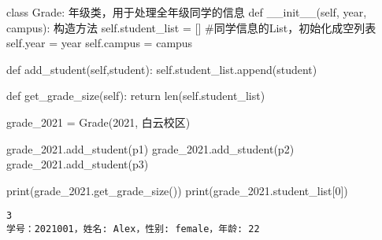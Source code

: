 \documentclass[
  letterpaper,
  DIV=11,
  numbers=noendperiod]{scrreprt}
\newenvironment{Shaded}{\begin{snugshade}}{\end{snugshade}}
\newcommand{\BuiltInTok}[1]{\textcolor[rgb]{0.00,0.23,0.31}{#1}}
\newcommand{\CommentTok}[1]{\textcolor[rgb]{0.37,0.37,0.37}{#1}}
\newcommand{\ControlFlowTok}[1]{\textcolor[rgb]{0.00,0.23,0.31}{#1}}
\newcommand{\DecValTok}[1]{\textcolor[rgb]{0.68,0.00,0.00}{#1}}
\newcommand{\FunctionTok}[1]{\textcolor[rgb]{0.28,0.35,0.67}{#1}}
\newcommand{\KeywordTok}[1]{\textcolor[rgb]{0.00,0.23,0.31}{#1}}
\newcommand{\NormalTok}[1]{\textcolor[rgb]{0.00,0.23,0.31}{#1}}
\newcommand{\OperatorTok}[1]{\textcolor[rgb]{0.37,0.37,0.37}{#1}}
\newcommand{\StringTok}[1]{\textcolor[rgb]{0.13,0.47,0.30}{#1}}
\newcommand{\VariableTok}[1]{\textcolor[rgb]{0.07,0.07,0.07}{#1}}
\begin{document}
\begin{Shaded}
\begin{Highlighting}[]
\KeywordTok{class}\NormalTok{ Grade:}
    \CommentTok{\textquotesingle{}\textquotesingle{}\textquotesingle{}}
\CommentTok{    年级类，用于处理全年级同学的信息}
\CommentTok{    \textquotesingle{}\textquotesingle{}\textquotesingle{}}
    \KeywordTok{def} \FunctionTok{\_\_init\_\_}\NormalTok{(}\VariableTok{self}\NormalTok{, year, campus):}
        \CommentTok{\textquotesingle{}\textquotesingle{}\textquotesingle{}}
\CommentTok{        构造方法}
\CommentTok{        \textquotesingle{}\textquotesingle{}\textquotesingle{}}
        \VariableTok{self}\NormalTok{.student\_list }\OperatorTok{=}\NormalTok{ [] }\CommentTok{\#同学信息的List，初始化成空列表}
        \VariableTok{self}\NormalTok{.year }\OperatorTok{=}\NormalTok{ year}
        \VariableTok{self}\NormalTok{.campus }\OperatorTok{=}\NormalTok{ campus}
    
    \KeywordTok{def}\NormalTok{ add\_student(}\VariableTok{self}\NormalTok{,student):}
        \VariableTok{self}\NormalTok{.student\_list.append(student)}
    
    \KeywordTok{def}\NormalTok{ get\_grade\_size(}\VariableTok{self}\NormalTok{):}
        \ControlFlowTok{return} \BuiltInTok{len}\NormalTok{(}\VariableTok{self}\NormalTok{.student\_list)}
\end{Highlighting}
\end{Shaded}

\begin{Shaded}
\begin{Highlighting}[]
\NormalTok{grade\_2021 }\OperatorTok{=}\NormalTok{ Grade(}\DecValTok{2021}\NormalTok{, }\StringTok{\textquotesingle{}白云校区\textquotesingle{}}\NormalTok{)}

\NormalTok{grade\_2021.add\_student(p1)}
\NormalTok{grade\_2021.add\_student(p2)}
\NormalTok{grade\_2021.add\_student(p3)}
\end{Highlighting}
\end{Shaded}

\begin{Shaded}
\begin{Highlighting}[]
\BuiltInTok{print}\NormalTok{(grade\_2021.get\_grade\_size())}
\BuiltInTok{print}\NormalTok{(grade\_2021.student\_list[}\DecValTok{0}\NormalTok{])}
\end{Highlighting}
\end{Shaded}

\begin{verbatim}
3
学号：2021001，姓名: Alex，性别: female，年龄: 22
\end{verbatim}
\end{document}
